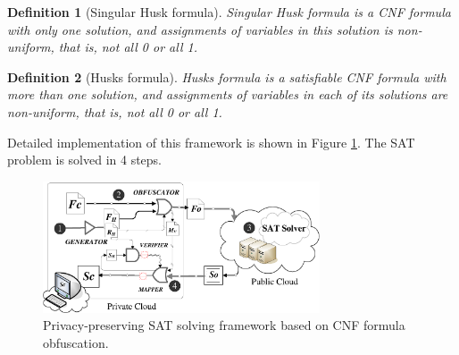 \documentclass[conference,compsocconf]{IEEEtran}
\newtheorem{definition}{\textbf{Definition}}
\begin{document}
\begin{definition}[Singular Husk formula]\label{Singular-Husk-formula-definition}
Singular Husk formula is a CNF formula with only one solution,
and assignments of variables in this solution is non-uniform,
that is,
not all 0 or all 1.
\end{definition}

\begin{definition}[Husks formula]\label{Husks-formula-definition}
Husks formula is a satisfiable CNF formula with more than one solution,
and assignments of variables in each of its solutions are non-uniform,
that is,
not all 0 or all 1.
\end{definition}

Detailed implementation of this framework is shown in Figure \ref{fig_cldSAT}.
The SAT problem is solved in 4 steps.
\begin{figure}
\footnotesize\centering
\centerline{\includegraphics[width=8.2cm]{Visio-cloudsat.eps}}
\caption{Privacy-preserving SAT solving framework based on CNF formula obfuscation.}
\label{fig_cldSAT}
\end{figure}

\end{document}
